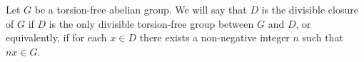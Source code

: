 \documentclass[12pt]{article}
\begin{document}
 Let $G$ be a torsion-free abelian group. We will say that $D$ is the divisible closure of $G$ if $D$ is the only divisible torsion-free group between $G$ and $D$, or equivalently, if for each $x \in D$ there exists a non-negative integer $n$ such that $nx \in G$.\newline

\end{document}
